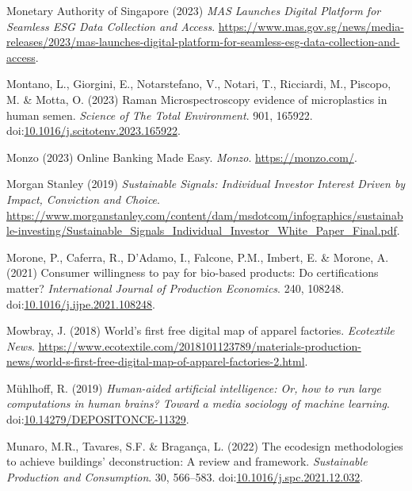 \documentclass[
  letterpaper,
  DIV=11,
  numbers=noendperiod]{scrartcl}
\newlength{\cslhangindent}
\newenvironment{CSLReferences}[2] %
 {\begin{list}{}{%
  \setlength{\itemindent}{0pt}
  \setlength{\leftmargin}{0pt}
  \setlength{\parsep}{0pt}
  \ifodd #1
   \setlength{\leftmargin}{\cslhangindent}
   \setlength{\itemindent}{-1\cslhangindent}
  \fi
  \setlength{\itemsep}{#2\baselineskip}}}
 {\end{list}}
\begin{document}
\begin{CSLReferences}{0}{1}
Monetary Authority of Singapore (2023) \emph{{MAS Launches Digital
Platform} for {Seamless ESG Data Collection} and {Access}}.
\url{https://www.mas.gov.sg/news/media-releases/2023/mas-launches-digital-platform-for-seamless-esg-data-collection-and-access}.

Montano, L., Giorgini, E., Notarstefano, V., Notari, T., Ricciardi, M.,
Piscopo, M. \& Motta, O. (2023) Raman {Microspectroscopy} evidence of
microplastics in human semen. \emph{Science of The Total Environment}.
901, 165922.
doi:\href{https://doi.org/10.1016/j.scitotenv.2023.165922}{10.1016/j.scitotenv.2023.165922}.

Monzo (2023) Online {Banking Made Easy}. \emph{Monzo}.
\url{https://monzo.com/}.

Morgan Stanley (2019) \emph{Sustainable {Signals}: {Individual Investor
Interest Driven} by {Impact}, {Conviction} and {Choice}}.
\url{https://www.morganstanley.com/content/dam/msdotcom/infographics/sustainable-investing/Sustainable_Signals_Individual_Investor_White_Paper_Final.pdf}.

Morone, P., Caferra, R., D'Adamo, I., Falcone, P.M., Imbert, E. \&
Morone, A. (2021) Consumer willingness to pay for bio-based products:
{Do} certifications matter? \emph{International Journal of Production
Economics}. 240, 108248.
doi:\href{https://doi.org/10.1016/j.ijpe.2021.108248}{10.1016/j.ijpe.2021.108248}.

Mowbray, J. (2018) World's first free digital map of apparel factories.
\emph{Ecotextile News}.
\url{https://www.ecotextile.com/2018101123789/materials-production-news/world-s-first-free-digital-map-of-apparel-factories-2.html}.

Mühlhoff, R. (2019) \emph{Human-aided artificial intelligence: {Or}, how
to run large computations in human brains? {Toward} a media sociology of
machine learning}.
doi:\href{https://doi.org/10.14279/DEPOSITONCE-11329}{10.14279/DEPOSITONCE-11329}.

Munaro, M.R., Tavares, S.F. \& Bragança, L. (2022) The ecodesign
methodologies to achieve buildings' deconstruction: {A} review and
framework. \emph{Sustainable Production and Consumption}. 30, 566--583.
doi:\href{https://doi.org/10.1016/j.spc.2021.12.032}{10.1016/j.spc.2021.12.032}.


\end{CSLReferences}
\end{document}
